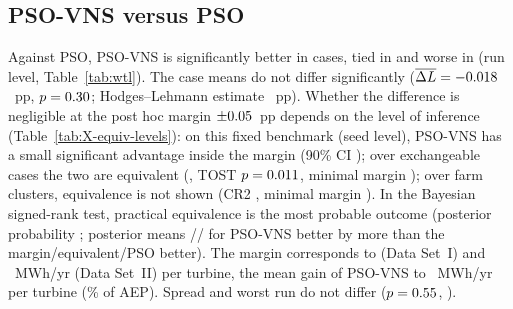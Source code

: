 \subsection{PSO-VNS versus PSO}
\label{sec:psovns-pso}
Against PSO, PSO-VNS is significantly better in \NWtlPSOW{} cases, tied in \NWtlPSOT{} and worse in \NWtlPSOL{} (run level, Table~\ref{tab:wtl}). The case means do not differ significantly ($\overline{\Delta L}=-0.018$~pp, $p=0.30$; Hodges--Lehmann estimate \NXHLPSOVNSvsPSO~pp). Whether the difference is negligible at the post hoc margin $\pm0.05$~pp depends on the level of inference (Table~\ref{tab:X-equiv-levels}): on this fixed benchmark (seed level), PSO-VNS has a small significant advantage inside the margin (90\% CI \NXEqSeedPSOVNSvsPSOCI); over exchangeable cases the two are equivalent (\NXEqCasePSOVNSvsPSOCI, TOST $p=0.011$, minimal margin \NXEqCasePSOVNSvsPSOMin); over farm clusters, equivalence is not shown (CR2 \NXEqClustPSOVNSvsPSOCI, minimal margin \NXEqClustPSOVNSvsPSOMin). In the Bayesian signed-rank test, practical equivalence is the most probable outcome (posterior probability \NBayPSOVNSvsPSORope; posterior means \NXBayMeanPSOVNSvsPSOLeft/\NXBayMeanPSOVNSvsPSORope/\NXBayMeanPSOVNSvsPSORight{} for PSO-VNS better by more than the margin/equivalent/PSO better). The margin corresponds to \NXMarginMWhTurbDsI{} (Data Set~I) and \NXMarginMWhTurbDsII~MWh/yr (Data Set~II) per turbine, the mean gain of PSO-VNS to \NXEnPSOVNSvsPSOMWhTurb~MWh/yr per turbine (\NXEnPSOVNSvsPSOPct\% of AEP). Spread and worst run do not differ ($p=0.55$, \NWorstP).

